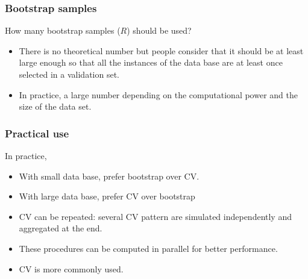 \begin{frame}
\frametitle{Bootstrap samples}
\begin{center}
How many bootstrap samples ($R$) should be used?
\end{center} 
\begin{itemize}
\item There is no theoretical number but people consider that it should be at least large enough so that all the instances of the data base are at least once selected in a validation set.
\item In practice, a large number depending on the computational power and the size of the data set. 
\end{itemize}
\end{frame}
\begin{frame}
\frametitle{Practical use}
In practice,
\begin{itemize}
\item With small data base, prefer bootstrap over CV.
\item With large data base, prefer CV over bootstrap
\item CV can be repeated: several CV pattern are simulated independently and aggregated at the end. 
\item These procedures can be computed in parallel for better performance.
\item CV is more commonly used. 
\end{itemize}
\end{frame}
